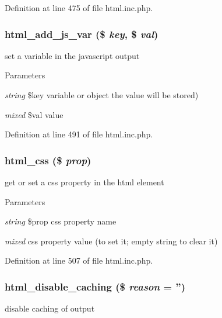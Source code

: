 Definition at line 475 of file html.inc.php.

\hypertarget{html_8inc_8php_a84769b7fe7b5454ff46534d0577eb54c}{
\subsubsection[{html\_\-add\_\-js\_\-var}]{\setlength{\rightskip}{0pt plus 5cm}html\_\-add\_\-js\_\-var (\$ {\em key}, \/  \$ {\em val})}}
\label{html_8inc_8php_a84769b7fe7b5454ff46534d0577eb54c}
set a variable in the javascript output


\begin{DoxyParams}{Parameters}
\item[{\em string}]\$key variable or object the value will be stored) \item[{\em mixed}]\$val value \end{DoxyParams}


Definition at line 491 of file html.inc.php.

\hypertarget{html_8inc_8php_ad52276fa2a03df7342ba4b8e6a334ce0}{
\subsubsection[{html\_\-css}]{\setlength{\rightskip}{0pt plus 5cm}html\_\-css (\$ {\em prop})}}
\label{html_8inc_8php_ad52276fa2a03df7342ba4b8e6a334ce0}
get or set a css property in the html element


\begin{DoxyParams}{Parameters}
\item[{\em string}]\$prop css property name \item[{\em mixed}]css property value (to set it; empty string to clear it) \end{DoxyParams}


Definition at line 507 of file html.inc.php.

\hypertarget{html_8inc_8php_ab0dafe79ee61164014b0a4d8b4112dbb}{
\subsubsection[{html\_\-disable\_\-caching}]{\setlength{\rightskip}{0pt plus 5cm}html\_\-disable\_\-caching (\$ {\em reason} = {\ttfamily ''})}}
\label{html_8inc_8php_ab0dafe79ee61164014b0a4d8b4112dbb}
disable caching of output


